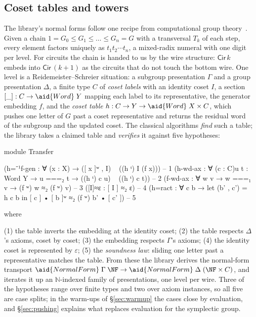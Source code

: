 \subsection{Coset tables and towers}\label{sec:engine}

The library's normal forms follow one recipe from computational group
theory~\cite{sims1994computation,holt2005handbook}.  Given a chain $1 =
G_0 \le G_1 \le \dots \le G_n = G$ with a transversal $T_k$ of each
step, every element factors uniquely as $t_1 t_2 \cdots t_n$, a
mixed-radix numeral with one digit per level.  For circuits the chain is
handed to us by the wire structure: $\mathsf{Cir}\,k$ embeds into
$\mathsf{Cir}\,(k{+}1)$ as the circuits that do not touch the bottom
wire.  One level is a Reidemeister--Schreier situation: a subgroup
presentation $\Gamma$ and a group presentation $\Delta$, a finite type
$C$ of \emph{coset labels} with an identity coset $I$, a section $[\_]
: C \to \aid{Word}\;Y$ mapping each label to its representative, the
generator embedding $f$, and the \emph{coset table} $h : C \to Y \to
\aid{Word}\;X \times C$, which pushes one letter of $G$ past a coset
representative and returns the residual word of the subgroup and the
updated coset.  The classical algorithms \emph{find} such a table; the
library takes a claimed table and \emph{verifies} it against five
hypotheses:

\begingroup\renewcommand{\AgdaCodeStyle}{\scriptsize}
\begin{code}[hide]
module Transfer
\end{code}
\begin{code}
  (h=⁻¹f-gen : ∀ (x : X) → ([ x ]ʷ , I) ~ ((h ᵗ) I (f x)))                          -- 1
  (h-wd-ax : ∀ (c : C){u t : Word Y} → u ===₂ t → ((h ᵗ) c u) ~ ((h ᵗ) c t))        -- 2
  (f-wd-ax : ∀ {w v} → w ===₁ v → (f ʷ) w ≈₂ (f ʷ) v)                               -- 3
  ([I]≈ε : [ I ] ≈₂ ε)                                                              -- 4
  (h=ract : ∀ c b → let (b' , c') = h c b in [ c ] • [ b ]ʷ ≈₂ (f ʷ) b' • [ c' ])   -- 5
\end{code}
\endgroup
\begin{code}[hide]
  where
\end{code}

\noindent (1) the table inverts the embedding at the identity coset;
(2) the table respects $\Delta$'s axioms, coset by coset; (3) the
embedding respects $\Gamma$'s axioms; (4) the identity coset is
represented by $\varepsilon$; (5) the \emph{soundness law}: sliding one
letter past a representative matches the table.  From these the library
derives the normal-form transport $\aid{NormalForm}\;\Gamma\;\NF \to
\aid{NormalForm}\;\Delta\;(\NF \times C)$, and 
iterates it up an $\mathbb{N}$-indexed family of presentations, one
level per wire.  Three of the hypotheses range over finite types and
two over axiom instances, so all five are case splits; in the warm-ups
of \S\ref{sec:warmup} the cases close by evaluation, and
\S\ref{sec:pushing} explains what replaces evaluation for the
symplectic group.

